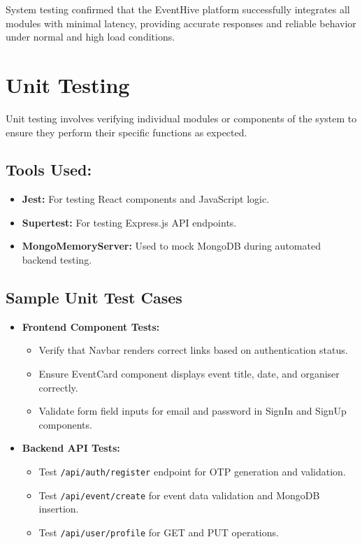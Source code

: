 \documentclass[12pt,a4paper]{report}
\begin{document}
\noindent
System testing confirmed that the EventHive platform successfully integrates all modules with minimal latency, providing accurate responses and reliable behavior under normal and high load conditions.

\section{Unit Testing}

Unit testing involves verifying individual modules or components of the system to ensure they perform their specific functions as expected.

\subsection*{Tools Used:}
\begin{itemize}
    \item \textbf{Jest:} For testing React components and JavaScript logic.
    \item \textbf{Supertest:} For testing Express.js API endpoints.
    \item \textbf{MongoMemoryServer:} Used to mock MongoDB during automated backend testing.
\end{itemize}

\subsection*{Sample Unit Test Cases}
\begin{itemize}
    \item \textbf{Frontend Component Tests:}
    \begin{itemize}
        \item Verify that Navbar renders correct links based on authentication status.
        \item Ensure EventCard component displays event title, date, and organiser correctly.
        \item Validate form field inputs for email and password in SignIn and SignUp components.
    \end{itemize}
    \item \textbf{Backend API Tests:}
    \begin{itemize}
        \item Test \texttt{/api/auth/register} endpoint for OTP generation and validation.
        \item Test \texttt{/api/event/create} for event data validation and MongoDB insertion.
        \item Test \texttt{/api/user/profile} for GET and PUT operations.
    \end{itemize}
\end{itemize}
\end{document}
